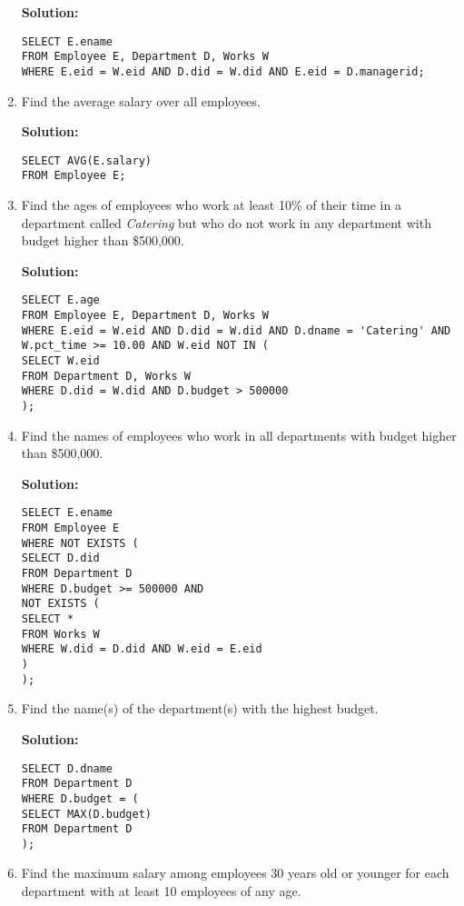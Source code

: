 \begin{enumerate}
\textbf{Solution:}

\begin{verbatim}
SELECT E.ename
FROM Employee E, Department D, Works W
WHERE E.eid = W.eid AND D.did = W.did AND E.eid = D.managerid;
\end{verbatim}

\item Find the average salary over all employees.

\textbf{Solution:}

\begin{verbatim}
SELECT AVG(E.salary)
FROM Employee E;
\end{verbatim}

\item Find the ages of employees who work at least 10\% of their time in a department called \textit{Catering} but who do not work in any department with budget higher than \$500,000.

\textbf{Solution:}

\begin{verbatim}
SELECT E.age
FROM Employee E, Department D, Works W
WHERE E.eid = W.eid AND D.did = W.did AND D.dname = 'Catering' AND W.pct_time >= 10.00 AND W.eid NOT IN (
SELECT W.eid
FROM Department D, Works W
WHERE D.did = W.did AND D.budget > 500000
);
\end{verbatim}

\item Find the names of employees who work in all departments with budget higher than \$500,000.

\textbf{Solution:}

\begin{verbatim}
SELECT E.ename
FROM Employee E
WHERE NOT EXISTS (
SELECT D.did
FROM Department D
WHERE D.budget >= 500000 AND
NOT EXISTS (
SELECT *
FROM Works W
WHERE W.did = D.did AND W.eid = E.eid
)
);
\end{verbatim}

\item Find the name(s) of the department(s) with the highest budget.

\textbf{Solution:}

\begin{verbatim}
SELECT D.dname
FROM Department D
WHERE D.budget = (
SELECT MAX(D.budget)
FROM Department D
);
\end{verbatim}

\item Find the maximum salary among employees 30 years old or younger for each department with at least 10 employees of any age.


\end{enumerate}
